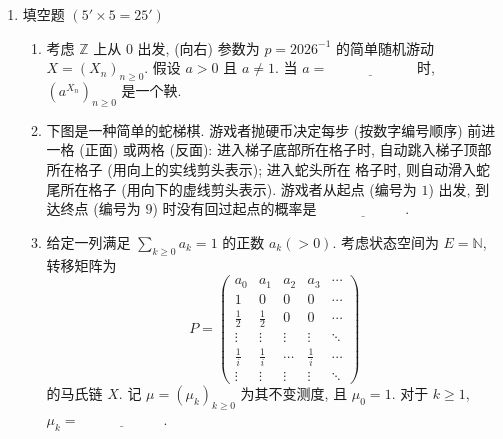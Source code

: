 \begin{enumerate}
    \item[一、]填空题 $(5'\times 5=25')$
    \begin{enumerate}[label=(\arabic*)]
        \item 考虑 $\mathbb Z$ 上从 $0$ 出发, (向右) 参数为 $p=2026^{-1}$ 的简单随机游动
        $X=(X_n)_{n\geq 0}$. 假设 $a>0$ 且 $a\neq 1$. 当 $a=\underline{\qquad\qquad\qquad}$
        时, $(a^{X_n})_{n\geq 0}$ 是一个鞅.

        \item 下图是一种简单的蛇梯棋. 游戏者抛硬币决定每步 (按数字编号顺序) 前进一格 (正面)
        或两格 (反面): 进入梯子底部所在格子时, 自动跳入梯子顶部所在格子 (用向上的实线剪头表示); 进入蛇头所在
        格子时, 则自动滑入蛇尾所在格子 (用向下的虚线剪头表示). 游戏者从起点 (编号为 $1$) 出发, 到达终点 (编号为
        $9$) 时没有回过起点的概率是 $\underline{\qquad\qquad\qquad}$.
        \begin{center}  \end{center}

        \item 给定一列满足 $\sum_{k\geq 0}a_k=1$ 的正数 $a_k(>0)$. 考虑状态空间为 $E=\mathbb N$,
        转移矩阵为
        \[
        P=
        \begin{pmatrix}
            a_0&a_1&a_2&a_3&\cdots\\
            1&0&0&0&\cdots\\
            \frac12&\frac12&0&0&\cdots\\
            \vdots&\vdots&\vdots&\vdots&\ddots\\
            \frac1i&\frac1i&\cdots&\frac1i&\cdots\\
            \vdots&\vdots&\vdots&\vdots&\ddots
        \end{pmatrix}
        \]
        的马氏链 $X$. 记 $\mu=(\mu_k)_{k\geq 0}$ 为其不变测度, 且 $\mu_0=1$. 对于
        $k\geq 1$, $\mu_k=\underline{\qquad\qquad\qquad}$.


\end{enumerate}
\end{enumerate}
